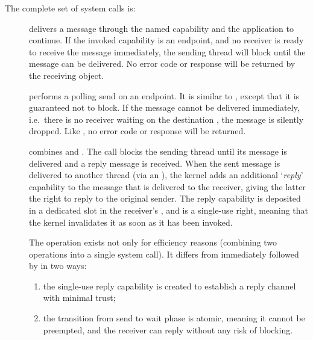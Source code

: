 The complete set of system calls is:
\begin{description}
    \item[] delivers a message through the named
    capability and the application to continue. If the invoked
    capability is an endpoint, and no receiver is ready to receive the message
    immediately, the sending thread will block until the message can be
    delivered. No error code or response will be returned by the receiving
    object.

    \item[] performs a polling send
      on an endpoint. It
    is similar to , except that it is
    guaranteed not to block. If the message
    cannot be delivered immediately, i.e.\ there is no receiver waiting
    on the destination , the message is silently dropped. Like
    , no error code or response will be returned.

    \item[] combines 
      and . The call
      blocks the sending thread until its message is delivered and a reply message is received. When the
    sent message is delivered to another thread (via an
    ), the kernel adds an
    additional `\emph{reply}' capability to the message that is delivered
    to the receiver, giving the latter the right to reply to the original sender. The reply
    capability is deposited in a dedicated slot in the receiver's
    , and is a single-use right, meaning that the kernel
    invalidates it as soon as it has been invoked.

    The  operation exists not only for
    efficiency reasons (combining two operations into a single system
    call). It differs from
     immediately followed by
     in two ways:
    \begin{enumerate}
    \item the single-use reply capability is created to establish a 
      reply channel with minimal trust;
    \item the transition from send to wait phase is atomic, meaning it
      cannot be preempted, and the receiver can reply without any risk
      of blocking.
    \end{enumerate}


\end{description}
